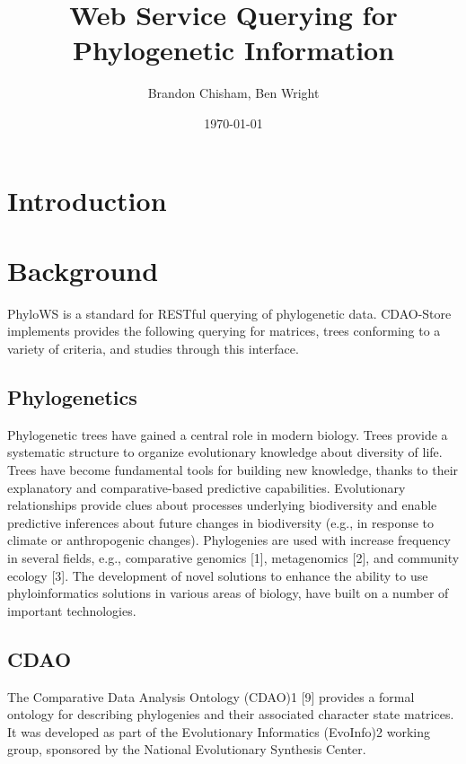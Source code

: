 \documentclass[10pt]{article}
\author{Brandon Chisham, Ben Wright}
\title{Web Service Querying for Phylogenetic Information}
\date{\today}
\begin{document}
\maketitle

\section{Introduction}

\section{Background}
PhyloWS is a standard for RESTful querying of phylogenetic data. CDAO-Store
implements provides the following querying for matrices, trees conforming to a
variety of criteria, and studies through this interface.

\subsection{Phylogenetics}
Phylogenetic trees have gained a central role in modern biology. Trees provide
a systematic structure to organize evolutionary knowledge about diversity of
life. Trees have become fundamental tools for building new knowledge, thanks to
their explanatory and comparative-based predictive capabilities.  Evolutionary
relationships provide clues about processes underlying biodiversity and enable
predictive inferences about future changes in biodiversity (e.g., in response
to climate or anthropogenic changes).  Phylogenies are used with increase
frequency in several fields, e.g., comparative genomics [1], metagenomics [2],
and community ecology [3].  The development of novel solutions to enhance the
ability to use phyloinformatics solutions in various areas of biology, have
built on a number of important technologies.

\subsection{CDAO}
The Comparative Data Analysis Ontology (CDAO)1 [9] provides a formal ontology
for describing phylogenies and their associated character state matrices.  It
was developed as part of the Evolutionary Informatics (EvoInfo)2 working group,
sponsored by the National Evolutionary Synthesis Center.
\end{document}

